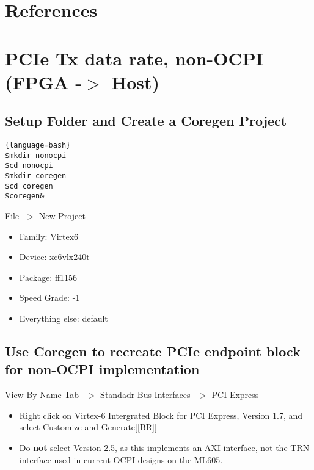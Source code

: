 \newpage

\tableofcontents

\newpage

\listoffigures

\newpage

\listoftables

\newpage

\section{References}


\section{PCIe Tx data rate, non-OCPI (FPGA -$>$ Host)}


\subsection{Setup Folder and Create a Coregen Project}

\begin{lstlisting}{language=bash}
$mkdir nonocpi
$cd nonocpi
$mkdir coregen
$cd coregen
$coregen&
\end{lstlisting}

File -$>$ New Project
\begin{itemize}
\item{Family: Virtex6}
\item{Device: xc6vlx240t}
\item{Package: ff1156}
\item{Speed Grade: -1}
\item{Everything else: default}
\end{itemize}
\subsection{Use Coregen to recreate PCIe endpoint block for non-OCPI implementation}
View By Name Tab --$>$ Standadr Bus Interfaces --$>$ PCI Express
\begin{itemize}

\item Right click on Virtex-6 Intergrated Block for PCI Express, Version 1.7, and select Customize and Generate[[BR]]
\item Do \textbf{not} select Version 2.5, as this implements an AXI interface, not the TRN interface used in current OCPI designs on the ML605. 

\end{itemize}

